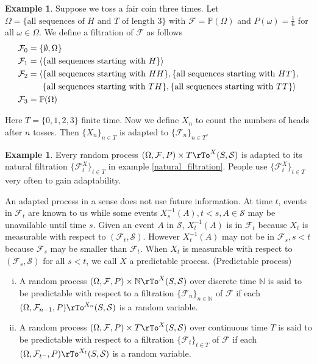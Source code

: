 \documentclass[12pt]{amsart}
\theoremstyle{definition}
\newtheorem{example}[theorem]{Example}
\begin{document}
\begin{example} \label{adapted_process} Suppose we toss a fair coin three times. Let $\Omega = \{\text{all sequences of } H \text{ and } T \text{ of length 3}\}$ with $\mathcal{F} = \mathbb{P}(\Omega)$ and $P(\omega) = \frac{1}{6}$ for all $\omega \in \Omega$. We define a filtration of $\mathcal{F}$ as follows
\begin{align*}
\mathcal{F}_0 & = \{\emptyset, \Omega\} \\
\mathcal{F}_1 & = \langle \{\textnormal{all sequences starting with } H\} \rangle \\
\mathcal{F}_2 & = \langle \{\textnormal{all sequences starting with } HH\}, \{\text{all sequences starting with } HT\}, \\
 & \hspace{17pt} \{\text{all sequences starting with } TH\}, \{\text{all sequences starting with } TT\} \rangle \\
\mathcal{F}_3 & = \mathbb{P}(\Omega)
\end{align*}

Here $T = \{0, 1, 2, 3\}$ finite time. Now we define $X_n$ to count the numbers of heads after $n$ tosses. Then $\{X_n\}_{n \in T}$ is adapted to $\{\mathcal{F}_n\}_{n \in T}$.
\end{example}

\begin{example} Every random process $(\Omega, \mathcal{F}, P) \times T \rTo^X (S, \mathcal{S})$ is adapted to its natural filtration $\{\mathcal{F}_t^X\}_{t \in T}$ in example \ref{natural_filtration}. People use $\{\mathcal{F}_t^X\}_{t \in T}$ very often to gain adaptability.
\end{example}

An adapted process in a sense does not use future information. At time $t$, events in $\mathcal{F}_t$ are known to us while some events $X_s^{-1}(A), t < s, A \in \mathcal{S}$ may be unavailable until time $s$. Given an event $A$ in $\mathcal{S}$, $X_t^{-1}(A)$ is in $\mathcal{F}_t$ because $X_t$ is measurable with respect to $(\mathcal{F}_t, \mathcal{S})$. However $X_t^{-1}(A)$ may not be in $\mathcal{F}_s, s < t$ because $\mathcal{F}_s$ may be smaller than $\mathcal{F}_t$. When $X_t$ is measurable with respect to $(\mathcal{F}_s, \mathcal{S})$ for all $s < t$, we call $X$ a predictable process.
\dfn (Predictable process)
\begin{enumerate}[i.]
\item A random process $(\Omega, \mathcal{F}, P) \times \mathbb{N} \rTo^X (S, \mathcal{S})$ over discrete time $\mathbb{N}$ is said to be predictable with respect to a filtration $\{\mathcal{F}_n\}_{n \in \mathbb{N}}$ of $\mathcal{F}$ if each $(\Omega, \mathcal{F}_{n-1}, P) \rTo^{X_n} (S, \mathcal{S})$ is a random variable.
\item A random process $(\Omega, \mathcal{F}, P) \times T \rTo^X (S, \mathcal{S})$ over continuous time $T$ is said to be predictable with respect to a filtration $\{\mathcal{F}_t\}_{t \in T}$ of $\mathcal{F}$ if each $(\Omega, \mathcal{F}_{t^{-}}, P) \rTo^{X_{t}} (S, \mathcal{S})$ is a random variable.
\end{enumerate}
\end{document}
